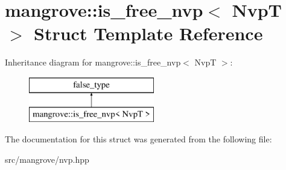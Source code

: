 \hypertarget{structmangrove_1_1is__free__nvp}{}\section{mangrove\+:\+:is\+\_\+free\+\_\+nvp$<$ NvpT $>$ Struct Template Reference}
\label{structmangrove_1_1is__free__nvp}
Inheritance diagram for mangrove\+:\+:is\+\_\+free\+\_\+nvp$<$ NvpT $>$\+:\begin{figure}[H]
\begin{center}
\leavevmode
\includegraphics[height=2.000000cm]{structmangrove_1_1is__free__nvp}
\end{center}
\end{figure}


The documentation for this struct was generated from the following file\+:\begin{DoxyCompactItemize}
\item 
src/mangrove/nvp.\+hpp\end{DoxyCompactItemize}
